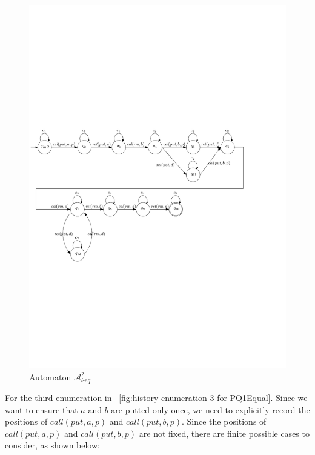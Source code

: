 \begin{figure}[htbp]
  \centering
  \includegraphics[width=0.8 \textwidth]{figures/PIC_AUTO_PQ1Equ-2.pdf}
  \caption{Automaton $\mathcal{A}_{\textit{l-eq}}^2$}
  \label{fig:automata for second enumeration of PQ1Equal}
\end{figure}

For the third enumeration in \figurename~\ref{fig:history enumeration 3 for PQ1Equal}. Since we want to ensure that $a$ and $b$ are putted only once, we need to explicitly record the positions of $\textit{call}(\textit{put},a,p)$ and $\textit{call}(\textit{put},b,p)$. Since the positions of $\textit{call}(\textit{put},a,p)$ and $\textit{call}(\textit{put},b,p)$ are not fixed, there are finite possible cases to consider, as shown below:

